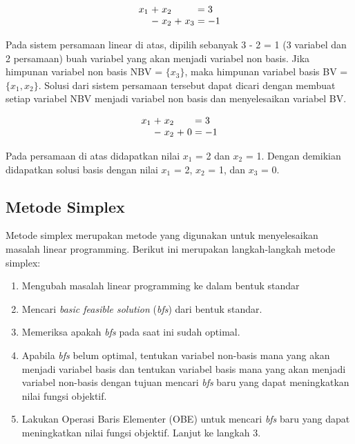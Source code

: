 \begin{equation*}
	\setlength\arraycolsep{1.5pt}
	\begin{array}{r c r c r c l}
		x_1 &+ &x_2 &  &    &= &3\\
		    &- &x_2 &+ &x_3 &= &-1
	\end{array}
\end{equation*}

Pada sistem persamaan linear di atas, dipilih sebanyak 3 - 2 = 1 (3 variabel dan 2 persamaan) buah variabel yang akan menjadi variabel non basis. Jika himpunan variabel non basis NBV = \(\{x_3\}\), maka himpunan variabel basis BV = \(\{x_1, x_2\}\). Solusi dari sistem persamaan tersebut dapat dicari dengan membuat setiap variabel NBV menjadi variabel non basis dan menyelesaikan variabel BV.

\begin{equation*}
	\setlength\arraycolsep{1.5pt}
	\begin{array}{r c r c r c l}
		x_1 &+ &x_2 &  &    &= &3\\
		    &- &x_2 &+ &0 &= &-1
	\end{array}
\end{equation*}

Pada persamaan di atas didapatkan nilai \(x_1\) = 2 dan \(x_2\) = 1. Dengan demikian didapatkan solusi basis dengan nilai \(x_1\) = 2, \(x_2\) = 1, dan \(x_3\) = 0.

\subsection{Metode Simplex}
Metode simplex merupakan metode yang digunakan untuk menyelesaikan masalah linear programming. Berikut ini merupakan langkah-langkah metode simplex:
\begin{enumerate}
	\item Mengubah masalah linear programming ke dalam bentuk standar
	\item Mencari \textit{basic feasible solution} (\textit{bfs}) dari bentuk standar.
	\item Memeriksa apakah \textit{bfs} pada saat ini sudah optimal.
	\item Apabila \textit{bfs} belum optimal, tentukan variabel non-basis mana yang akan menjadi variabel basis dan tentukan variabel basis mana yang akan menjadi variabel non-basis dengan tujuan mencari \textit{bfs} baru yang dapat meningkatkan nilai fungsi objektif.
	\item Lakukan Operasi Baris Elementer (OBE) untuk mencari \textit{bfs} baru yang dapat meningkatkan nilai fungsi objektif. Lanjut ke langkah 3.
\end{enumerate}

